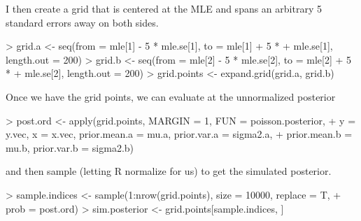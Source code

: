 \documentclass{beamer}
\begin{document}
\begin{frame}[fragile]
I then create a grid that is centered at the MLE and spans an
arbitrary 5 standard errors away on both sides.
\pause
\medskip
\tiny
\begin{Schunk}
\begin{Sinput}
> grid.a <- seq(from = mle[1] - 5 * mle.se[1], to = mle[1] + 5 * 
+     mle.se[1], length.out = 200)
> grid.b <- seq(from = mle[2] - 5 * mle.se[2], to = mle[2] + 5 * 
+     mle.se[2], length.out = 200)
> grid.points <- expand.grid(grid.a, grid.b)
\end{Sinput}
\end{Schunk}
\pause
\normalsize
\bigskip
Once we have the grid points, we can evaluate at the unnormalized posterior
\tiny
\pause
\medskip
\begin{Schunk}
\begin{Sinput}
> post.ord <- apply(grid.points, MARGIN = 1, FUN = poisson.posterior, 
+     y = y.vec, x = x.vec, prior.mean.a = mu.a, prior.var.a = sigma2.a, 
+     prior.mean.b = mu.b, prior.var.b = sigma2.b)
\end{Sinput}
\end{Schunk}
\pause
\bigskip
\normalsize
and then sample (letting R normalize for us) to get the simulated posterior.
\pause
\medskip
\tiny
\begin{Schunk}
\begin{Sinput}
> sample.indices <- sample(1:nrow(grid.points), size = 10000, replace = T, 
+     prob = post.ord)
> sim.posterior <- grid.points[sample.indices, ]
\end{Sinput}
\end{Schunk}
\normalsize
\end{frame}
\end{document}
